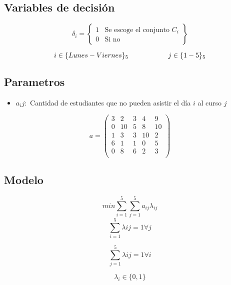 \documentclass[]{article}
\begin{document}
\subsection{Variables de decisi\'on}

\begin{equation*}
\delta_{i} = 
 \left\{ \begin{array}{cl}
 1 & \mbox{Se escoge el conjunto $C_i$}\\
 0 & \mbox{Si no}
 \end{array} \right\}
\end{equation*}



$$i \in \{Lunes - Viernes\}_5 \hspace*{2cm } j \in \{1-5\}_5 $$


\subsection{Parametros}

\begin{itemize}
	\item $a_ij : $ Cantidad de estudiantes que no pueden asistir el d\'ia $i$ al curso $j$ 
\end{itemize}


\begin{equation*}
	a = 
	\begin{pmatrix}
		3 & 2 & 3 & 4 & 9 \\
		0 & 10 & 5 & 8 & 10 \\
		1 & 3 & 3 & 10 & 2 \\
		6 & 1 & 1 & 0 & 5 \\
		0 & 8 & 6 & 2 & 3 \\
	\end{pmatrix}
\end{equation*}



\subsection{Modelo}
$$min \sum_{i=1}^{5} \sum_{j=1}^{5} a_{ij} \lambda_{ij}$$
$$\sum_{i=1}^{5} \lambda{ij}  = 1 \forall j$$

$$\sum_{j=1}^{5} \lambda{ij} =  1 \forall i$$

$$ \lambda_i \in \{0,1\}$$
\end{document}
